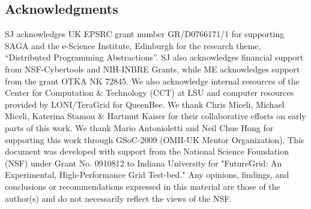 \documentclass[3p,twocolumn]{elsarticle}
\begin{document}




\subsection*{Acknowledgments}

\small{SJ acknowledges UK EPSRC grant number GR/D0766171/1 for
  supporting SAGA and the e-Science Institute, Edinburgh for the
  research theme, ``Distributed Programming Abstractions''.  SJ also
  acknowledges financial support from NSF-Cybertools and NIH-INBRE
  Grants, while ME acknowledges support from the grant OTKA NK 72845.
  We also acknowledge internal resources of the Center for Computation
  \& Technology (CCT) at LSU and computer resources provided by
  LONI/TeraGrid for QueenBee.  We thank Chris Miceli, Michael Miceli,
  Katerina Stamou \& Hartmut Kaiser for their collaborative efforts on
  early parts of this work. We thank Mario Antonioletti and Neil Chue
  Hong for supporting this work through GSoC-2009 (OMII-UK Mentor
  Organization). This document was developed with support from the
  National Science Foundation (NSF) under Grant No. 0910812 to Indiana
  University for "FutureGrid: An Experimental, High-Performance Grid
  Test-bed." Any opinions, findings, and conclusions or
  recommendations expressed in this material are those of the
  author(s) and do not necessarily reflect the views of the NSF.}



\end{document}
